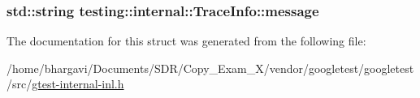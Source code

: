 \subsubsection[{\texorpdfstring{message}{message}}]{\setlength{\rightskip}{0pt plus 5cm}std\+::string testing\+::internal\+::\+Trace\+Info\+::message}\hypertarget{structtesting_1_1internal_1_1_trace_info_a39e74f39ce6d5fdbac799abdb1c27f90}{}\label{structtesting_1_1internal_1_1_trace_info_a39e74f39ce6d5fdbac799abdb1c27f90}


The documentation for this struct was generated from the following file\+:\begin{DoxyCompactItemize}
\item 
/home/bhargavi/\+Documents/\+S\+D\+R/\+Copy\+\_\+\+Exam\+\_\+X/vendor/googletest/googletest/src/\hyperlink{gtest-internal-inl_8h}{gtest-\/internal-\/inl.\+h}\end{DoxyCompactItemize}
